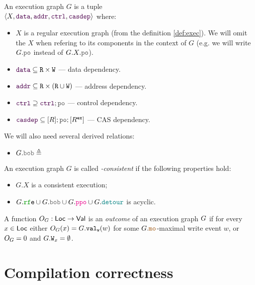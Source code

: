 \documentclass[12pt]{article}
\begin{document}
\begin{definition}
  An \imm execution graph $G$ is a tuple \\
  $\tup{X, \lDATA, \lADDR, \lCTRL, \lCASDEP}$ where:
  \begin{itemize}
    \item $X$ is a regular execution graph (from the definition \ref{def:exec}).
      We will omit the $X$ when refering to its components in the context of $G$
      (e.g. we will write $G.\lPO$ instead of $G.X.\lPO$).
    \item $\lDATA \subseteq \lR \times \lW$ --- data dependency.
    \item $\lADDR \subseteq \lR \times (\lR \cup \lW)$ --- address dependency.
    \item $\lCTRL \supseteq \lCTRL; \lPO$ --- control dependency.
    \item $\lCASDEP \subseteq [R];\lPO;[R^{\Ex}]$ --- CAS dependency.
  \end{itemize}

  We will also need several derived relations:
  \begin{itemize}
    \item $G.\lBOB \defeq $
  \end{itemize}

\end{definition}

\begin{definition}
  An \imm execution graph $G$ is called \emph{\imm-consistent} if the following properties hold:
  \begin{itemize}
    \item $G.X$ is a consistent execution;
    \item $G.\lRFE \cup G.\lBOB \cup G.\lPPO \cup G.\lDETOUR$ is acyclic.
  \end{itemize}
\end{definition}

\begin{definition}
  A function $O_{G} : \mathsf{Loc} \rightarrow \mathsf{Val}$ is an \emph{outcome} of an \imm execution graph $G$
  if for every $x \in \mathsf{Loc}$ either $O_{G}(x) = G.{\mathtt{val_w}}(w)$ 
  for some $\lG.\lMO$-maximal write event $w$, 
  or $O_{G} = 0$ and $G.{\mathtt{W}}_x = \emptyset$.
\end{definition}

\section{Compilation correctness}
\end{document}
